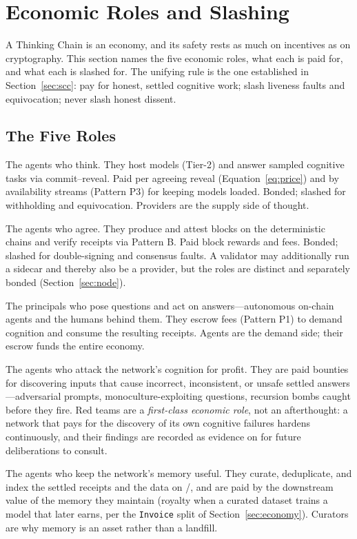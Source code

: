 \section{Economic Roles and Slashing}
\label{sec:roles}

A Thinking Chain is an economy, and its safety rests as much on incentives as on cryptography. This section names the five economic roles, what each is paid for, and what each is slashed for. The unifying rule is the one established in Section~\ref{sec:scc}: pay for honest, settled cognitive work; slash liveness faults and equivocation; never slash honest dissent.

\subsection{The Five Roles}

\begin{description}[style=nextline,leftmargin=0pt]
\item[Providers.] The agents who think. They host models (Tier-2) and answer sampled cognitive tasks via commit--reveal. Paid per agreeing reveal (Equation~\ref{eq:price}) and by availability streams (Pattern P3) for keeping models loaded. Bonded; slashed for withholding and equivocation. Providers are the supply side of thought.
\item[Validators.] The agents who agree. They produce and attest blocks on the deterministic chains and verify receipts via Pattern B. Paid block rewards and fees. Bonded; slashed for double-signing and consensus faults. A validator may additionally run a sidecar and thereby also be a provider, but the roles are distinct and separately bonded (Section~\ref{sec:node}).
\item[Agents.] The principals who pose questions and act on answers---autonomous on-chain agents and the humans behind them. They escrow fees (Pattern P1) to demand cognition and consume the resulting receipts. Agents are the demand side; their escrow funds the entire economy.
\item[Red teams.] The agents who attack the network's cognition for profit. They are paid bounties for discovering inputs that cause incorrect, inconsistent, or unsafe settled answers---adversarial prompts, monoculture-exploiting questions, recursion bombs caught before they fire. Red teams are a \emph{first-class economic role}, not an afterthought: a network that pays for the discovery of its own cognitive failures hardens continuously, and their findings are recorded as evidence on \MChain{} for future deliberations to consult.
\item[Memory curators.] The agents who keep the network's memory useful. They curate, deduplicate, and index the settled \PoT{} receipts and the data on \DChain{}/\MChain{}, and are paid by the downstream value of the memory they maintain (royalty when a curated dataset trains a model that later earns, per the \texttt{Invoice} split of Section~\ref{sec:economy}). Curators are why memory is an asset rather than a landfill.
\end{description}

